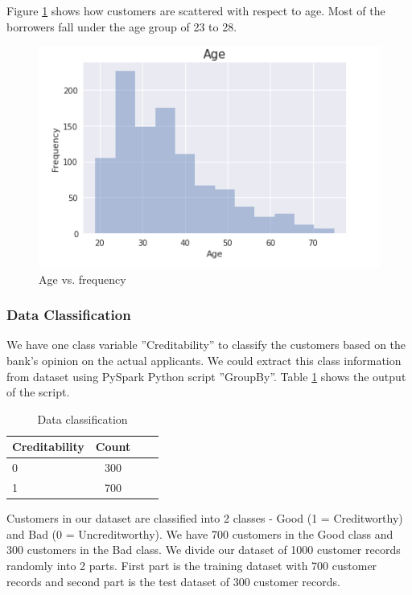 \documentclass[sigconf]{acmart}
\begin{document}
Figure \ref{fig:Figure13} shows how customers are scattered with respect to age. Most of the borrowers fall under the age group of 23 to 28.

\begin{figure}[htb]
  \centering
  \includegraphics[width=1.0\columnwidth]{images/Figure13.png}
  \caption{Age vs. frequency}
  \label{fig:Figure13} 
\end{figure}

\subsubsection{Data Classification}\label{Data Classification}

We have one class variable ''Creditability'' to classify the customers based on the bank's opinion on the actual applicants. We could extract this class information from dataset using PySpark Python script ''GroupBy''. Table \ref{tab:table2} shows the output of the script.


\begin{table}
  \caption{Data classification}
  \label{tab:table2}
  \begin{tabular}{lclc}
    \toprule
     Creditability& Count\\
    \midrule
    0& 300\\
    1& 700\\
    \bottomrule
  \end{tabular}
\end{table}

Customers in our dataset are classified into 2 classes - Good (1 = Creditworthy) and Bad (0 = Uncreditworthy). We have 700 customers in the Good class and 300 customers in the Bad class. We divide our dataset of 1000 customer records randomly into 2 parts. First part is the training dataset with 700 customer records and second part is the test dataset of 300 customer records.
\end{document}
